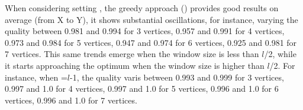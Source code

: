 When considering setting \average, the greedy approach () provides good results on average (from X to Y), it shows substantial oscillations, for instance, varying the quality between 0.981 and 0.994 for 3 vertices, 0.957 and 0.991 for 4 vertices, 0.973 and 0.984 for 5 vertices, 0.947 and 0.974 for 6 vertices, 0.925 and 0.981 for 7 vertices. This same trends emerge when the window size is less than $l$/2, while it starts approaching the optimum when the window size is higher than $l$/2. For instance, when \windowsize=$l$-1, the quality varis between  0.993 and  0.999 for 3 vertices, 0.997 and 1.0 for 4 vertices, 0.997 and 1.0 for 5 vertices, 0.996 and 1.0 for 6 vertices, 0.996 and 1.0 for 7 vertices.




